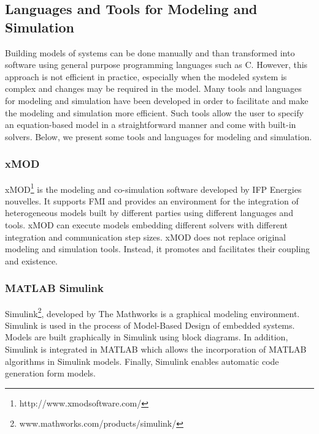 \subsection{Languages and Tools for Modeling and Simulation}

Building models of systems can be done manually and than transformed into software using general purpose programming languages such as C. However, this approach is not efficient in practice, especially when the modeled system is complex and changes may be required in the model. Many tools and languages for modeling and simulation have been developed in order to facilitate and make the modeling and simulation more efficient. Such tools allow the user to specify an equation-based model in a straightforward manner and come with built-in solvers. Below, we present some tools and languages for modeling and simulation.

\subsubsection{xMOD}
xMOD\footnote{http://www.xmodsoftware.com/} is the modeling and co-simulation software developed by IFP Energies nouvelles. It supports FMI and provides an environment for the integration of heterogeneous models built by different parties using different languages and tools. xMOD can execute models embedding different solvers with different integration and communication step sizes. xMOD does not replace original modeling and simulation tools. Instead, it promotes and facilitates their coupling and existence.


\subsubsection{MATLAB Simulink}
Simulink\footnote{www.mathworks.com/products/simulink/}, developed by The Mathworks is a graphical modeling environment. Simulink is used in the  process of Model-Based Design of embedded systems. Models are built graphically in Simulink using block diagrams. In addition, Simulink is integrated in MATLAB which allows the incorporation of MATLAB algorithms in Simulink models. Finally, Simulink enables automatic code generation form models.

